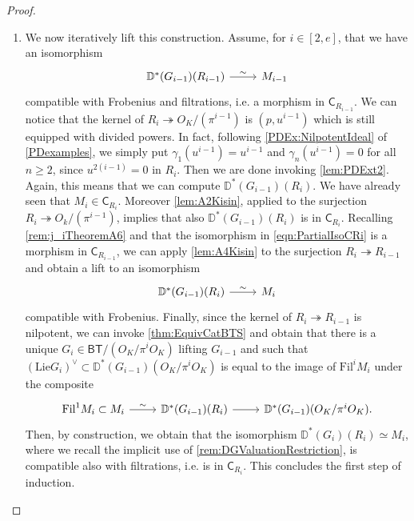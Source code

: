 \begin{proof}
\begin{enumerate}
\item We now iteratively lift this construction.
	Assume, for $i \in [2,e]$, that we have an isomorphism
	\begin{equation}\label{eqn:PartialIsoCRi}
	\begin{tikzcd}
	\mathbb{D}^*(G_{i-1})(R_{i-1}) 
	\arrow[r, "\sim", rightarrow] &
	M_{i-1}
	\end{tikzcd}
	\end{equation}
	compatible with Frobenius and filtrations, i.e. a morphism in $\mathsf{C}_{R_{i-1}}$.
	We can notice that the kernel of $R_i \twoheadrightarrow O_K/ (\pi^{i-1})$
	is $(p, u^{i-1})$ which is still equipped with divided powers.
	In fact, following \cref{PDEx:NilpotentIdeal} of \cref{PDexamples},
	we simply put $\gamma_1(u^{i-1}) = u^{i-1}$ and
	$\gamma_n(u^{i-1}) = 0$ for all $n \geq 2$,
	since $u^{2(i-1)} = 0$ in $R_i$.
	Then we are done invoking \cref{lem:PDExt2}.
	Again, this means that we can compute $\mathbb{D}^*(G_{i-1})(R_i)$.
	We have already seen that $M_i \in \mathsf{C}_{R_i}$.
	Moreover \cref{lem:A2Kisin},
	applied to the surjection $R_i \twoheadrightarrow O_k/ (\pi^{i-1})$, implies that
	also $\mathbb{D}^*(G_{i-1})(R_i)$ is in $\mathsf{C}_{R_i}$.
	Recalling \cref{rem:j_iTheoremA6} and that the isomorphism in \cref{eqn:PartialIsoCRi}
	is a morphism in $\mathsf{C}_{R_{i-1}}$, 
	we can apply \cref{lem:A4Kisin} to the surjection $R_i \twoheadrightarrow R_{i-1}$
	and obtain a lift to an isomorphism
	\begin{equation*}
	\begin{tikzcd}
	\mathbb{D}^*(G_{i-1})(R_{i}) 
	\arrow[r, "\sim", rightarrow] &
	M_{i}
	\end{tikzcd}
	\end{equation*}
	compatible with Frobenius.
	Finally, since the kernel of $R_i \twoheadrightarrow R_{i-1}$ is nilpotent,
	we can invoke \cref{thm:EquivCatBTS} and obtain that
	there is a unique $G_i \in \mathsf{BT}/ (O_K/\pi^iO_K)$
	lifting $G_{i-1}$ and such that $(\mathrm{Lie}G_i)^\vee \subset \mathbb{D}^*(G_{i-1})(O_K/\pi^i O_K)$
	is equal to the image of $\mathrm{Fil}^i M_i$ under the composite
	\begin{equation*}
	\begin{tikzcd}
		\mathrm{Fil}^1 M_i \subset M_i
		\arrow[r, "\sim", rightarrow] &
		\mathbb{D}^*(G_{i-1})(R_i)
		\arrow[r, "", rightarrow] &
		\mathbb{D}^*(G_{i-1})(O_K/\pi^iO_K)
	.\end{tikzcd}
	\end{equation*}
	Then, by construction, we obtain that the isomorphism
	$\mathbb{D}^*(G_i)(R_i) \simeq M_i$, where we recall the implicit use of 
	\cref{rem:DGValuationRestriction}, is compatible also with filtrations,
	i.e. is in $\mathsf{C}_{R_i}$.
	This concludes the first step of induction.


\end{enumerate}
\end{proof}
